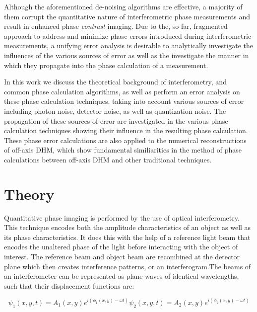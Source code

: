 \documentclass[10pt,letterpaper]{article}
\begin{document}
Although the aforementioned de-noising algorithms are effective, a majority of them corrupt the quantitative nature of interferometric phase measurements and result in enhanced phase \textit{contrast} imaging. Due to the, so far, fragmented approach to address and minimize phase errors introduced during interferometric measurements, a unifying error analysis is desirable to analytically investigate the influences of the various sources of error as well as the investigate the manner in which they propagate into the phase calculation of a measurement.\par

 In this work we discuss the theoretical background of interferometry, and common phase calculation algorithms, as well as perform an error analysis on these phase calculation techniques, taking into account various sources of error including photon noise, detector noise, as well as quantization noise. The propagation of these sources of error are investigated in the various phase calculation techniques showing their influence in the resulting phase calculation. These phase error calculations are also applied to the numerical reconstructions of off-axis DHM, which show fundamental similiarities in the method of phase calculations between off-axis DHM and other traditional techniques.

\section{Theory}
Quantitative phase imaging is performed by the use of optical interferometry. This technique encodes both the amplitude characteristics of an object as well as its phase characteristics. It does this with the help of a reference light beam that encodes the unaltered phase of the light before interacting with the object of interest. The reference beam and object beam are recombined at the detector plane which then creates interference patterns, or an interferogram.The beams of an interferometer can be represented as plane waves of identical wavelengths, such that their displacement functions are:

\begin{subequations}
\begin{equation}
 \psi_1(x,y,t)=A_1(x,y)e^{i(\phi_1(x,y)-\omega t)}
 \end{equation}
 \begin{equation}
 \psi_2(x,y,t)=A_2(x,y)e^{i(\phi_2(x,y)-\omega t)}
 \end{equation}
 \end{subequations}
 
\end{document}
